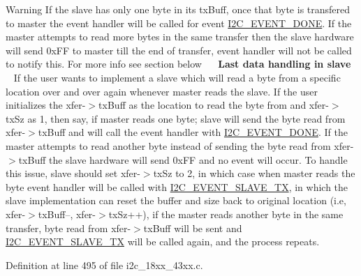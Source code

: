 \begin{DoxyWarning}{Warning}
If the slave has only one byte in its tx\+Buff, once that byte is transfered to master the event handler will be called for event \hyperlink{i2c__18xx__43xx_8h_gacb2cd4e03ea48339d327e4f387441bf3a43d00f7d92100d4af6df5514e4ccf1d1}{I2\+C\+\_\+\+E\+V\+E\+N\+T\+\_\+\+D\+O\+NE}. If the master attempts to read more bytes in the same transfer then the slave hardware will send 0x\+FF to master till the end of transfer, event handler will not be called to notify this. For more info see section below~\newline
 ~\newline
{\bfseries  Last data handling in slave }~\newline
 If the user wants to implement a slave which will read a byte from a specific location over and over again whenever master reads the slave. If the user initializes the xfer-\/$>$tx\+Buff as the location to read the byte from and xfer-\/$>$tx\+Sz as 1, then say, if master reads one byte; slave will send the byte read from xfer-\/$>$tx\+Buff and will call the event handler with \hyperlink{i2c__18xx__43xx_8h_gacb2cd4e03ea48339d327e4f387441bf3a43d00f7d92100d4af6df5514e4ccf1d1}{I2\+C\+\_\+\+E\+V\+E\+N\+T\+\_\+\+D\+O\+NE}. If the master attempts to read another byte instead of sending the byte read from xfer-\/$>$tx\+Buff the slave hardware will send 0x\+FF and no event will occur. To handle this issue, slave should set xfer-\/$>$tx\+Sz to 2, in which case when master reads the byte event handler will be called with \hyperlink{i2c__18xx__43xx_8h_gacb2cd4e03ea48339d327e4f387441bf3a3911d9b6505f77f0bed3f21b2710ca58}{I2\+C\+\_\+\+E\+V\+E\+N\+T\+\_\+\+S\+L\+A\+V\+E\+\_\+\+TX}, in which the slave implementation can reset the buffer and size back to original location (i.\+e, xfer-\/$>$tx\+Buff--, xfer-\/$>$tx\+Sz++), if the master reads another byte in the same transfer, byte read from xfer-\/$>$tx\+Buff will be sent and \hyperlink{i2c__18xx__43xx_8h_gacb2cd4e03ea48339d327e4f387441bf3a3911d9b6505f77f0bed3f21b2710ca58}{I2\+C\+\_\+\+E\+V\+E\+N\+T\+\_\+\+S\+L\+A\+V\+E\+\_\+\+TX} will be called again, and the process repeats. 
\end{DoxyWarning}


Definition at line 495 of file i2c\+\_\+18xx\+\_\+43xx.\+c.

\mbox{\label{group___i2_c__18_x_x__43_x_x_ga650618a5f4717c46ae3ea304142ddc03}} 
